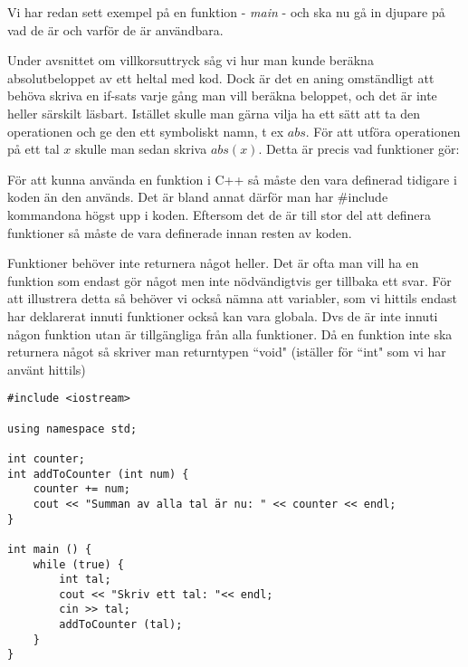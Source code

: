 Vi har redan sett exempel på en funktion - \emph{main} - och ska nu gå in djupare på vad de är och varför de är användbara.

Under avsnittet om villkorsuttryck såg vi hur man kunde beräkna absolutbeloppet av ett heltal med kod. Dock är det en aning omständligt att behöva skriva en if-sats varje gång man vill beräkna beloppet, och det är inte heller särskilt läsbart. Istället skulle man gärna vilja ha ett sätt att ta den operationen och ge den ett symboliskt namn, t ex $abs$. För att utföra operationen på ett tal $x$ skulle man sedan skriva $abs(x)$. Detta är precis vad funktioner gör:




För att kunna använda en funktion i C++ så måste den vara definerad tidigare i koden än den används. Det är bland annat därför man har \#include kommandona högst upp i koden. Eftersom det de är till stor del att definera funktioner så måste de vara definerade innan resten av koden.

Funktioner behöver inte returnera något heller. Det är ofta man vill ha en funktion som endast gör något men inte nödvändigtvis ger tillbaka ett svar. För att illustrera detta så behöver vi också nämna att variabler, som vi hittils endast har deklarerat innuti funktioner också kan vara globala. Dvs de är inte innuti någon funktion utan är tillgängliga från alla funktioner. Då en funktion inte ska returnera något så skriver man returntypen ``void" (iställer för ``int" som vi har använt hittils)

\begin{lstlisting}
#include <iostream>

using namespace std;

int counter;
int addToCounter (int num) {
	counter += num;
	cout << "Summan av alla tal är nu: " << counter << endl;
}

int main () {
	while (true) {
		int tal;
		cout << "Skriv ett tal: "<< endl;
		cin >> tal;
		addToCounter (tal);
	}
}
\end{lstlisting}
